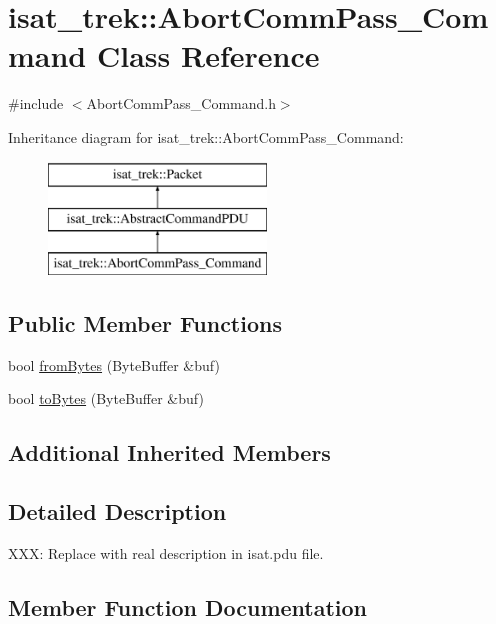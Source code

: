 \hypertarget{classisat__trek_1_1_abort_comm_pass___command}{}\section{isat\+\_\+trek\+:\+:Abort\+Comm\+Pass\+\_\+\+Command Class Reference}
\label{classisat__trek_1_1_abort_comm_pass___command}


{\ttfamily \#include $<$Abort\+Comm\+Pass\+\_\+\+Command.\+h$>$}

Inheritance diagram for isat\+\_\+trek\+:\+:Abort\+Comm\+Pass\+\_\+\+Command\+:\begin{figure}[H]
\begin{center}
\leavevmode
\includegraphics[height=3.000000cm]{classisat__trek_1_1_abort_comm_pass___command}
\end{center}
\end{figure}
\subsection*{Public Member Functions}
\begin{DoxyCompactItemize}
\item 
bool \hyperlink{classisat__trek_1_1_abort_comm_pass___command_ac7c845fe5a220a86c97515ed6c019fe1}{from\+Bytes} (Byte\+Buffer \&buf)
\item 
bool \hyperlink{classisat__trek_1_1_abort_comm_pass___command_a69a3b951da063672413e2ecbbc508dde}{to\+Bytes} (Byte\+Buffer \&buf)
\end{DoxyCompactItemize}
\subsection*{Additional Inherited Members}


\subsection{Detailed Description}
X\+XX\+: Replace with real description in isat.\+pdu file. 

\subsection{Member Function Documentation}
